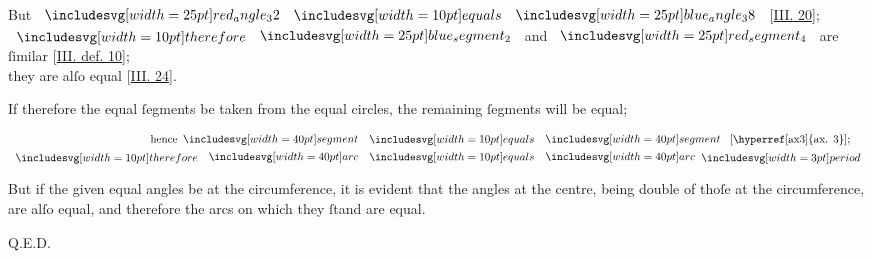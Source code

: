 \documentclass[12pt,preview]{standalone}
\begin{document}
\begin{minipage}[t]{0.64\textwidth}
    \hfill

    \begin{center}
        But $\img{red_angle_32} \bequals \img{blue_angle_38}$ [\hyperref[book3pr20]{\textsc{III.} 20}];\\
        $\btherefore \img{blue_segment_2}$ and $\img{red_segment_4}$ are ſimilar [\hyperref[book3def10]{\textsc{III.} def. 10}];\\
        they are alſo equal [\hyperref[book3pr24]{\textsc{III.} 24}].
    \end{center}
\end{minipage}%

\hfill

\hfill

\pagebreak

\begin{minipage}[t]{0.64\textwidth}
    \vspace{0pt}
    \raggedright If therefore the equal ſegments be taken from the equal circles, the remaining ſegments will be equal;\\

    \hfill

    \begin{center}
        $\begin{aligned}
                \text{hence} \img[0][0][40]{segment} & \bequals \img[0][0][40]{segment} \text{ [\hyperref[ax3]{ax. 3}];} \\
                \btherefore \img[0][0][40]{arc}      & \bequals \img[0][0][40]{arc} \bperiod
            \end{aligned}$
    \end{center}

    \hfill

    \raggedright But if the given equal angles be at the circumference, it is evident that the angles at the centre, being double of thoſe at the circumference, are alſo equal, and therefore the arcs on which they ſtand are equal.

    \hfill

    \hfill Q.E.D.
\end{minipage}
\end{document}
